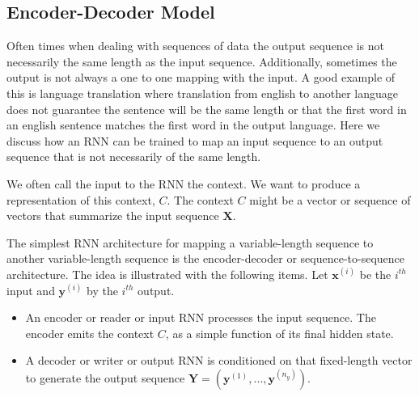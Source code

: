 \documentclass[12pt]{article}
\begin{document}
    \subsection{Encoder-Decoder Model}
        Often times when dealing with sequences of data the output sequence is not necessarily the same length as the
        input sequence. Additionally, sometimes the output is not always a one to one mapping with the input. A good
        example of this is language translation where translation from english to another language does not guarantee
        the sentence will be the same length or that the first word in an english sentence matches the first word in the
        output language. Here we discuss how an RNN can be trained to map an input sequence to an output sequence that
        is not necessarily of the same length.

        We often call the input to the RNN the context. We want to produce a representation of this context, $C$. The
        context $C$ might be a vector or sequence of vectors that summarize the input sequence $\boldsymbol{X}$.

        The simplest RNN architecture for mapping a variable-length sequence to another variable-length sequence is the
        encoder-decoder or sequence-to-sequence architecture. The idea is illustrated with the following items. Let
        $\boldsymbol{x}^{(i)}$ be the $i^{th}$ input and $\boldsymbol{y}^{(i)}$ by the $i^{th}$ output.

        \begin{itemize}
            \item An encoder or reader or input RNN processes the input sequence. The encoder emits the context $C$,
            as a simple function of its final hidden state.
            \item A decoder or writer or output RNN is conditioned on that fixed-length vector to generate the output
            sequence $\boldsymbol{Y} = (\boldsymbol{y}^{(1)}, ..., \boldsymbol{y}^{(n_y)})$.
        \end{itemize}
\end{document}
